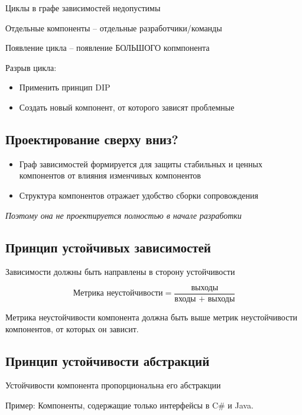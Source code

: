 Циклы в графе зависимостей недопустимы

Отдельные компоненты -- отдельные разработчики/команды

Появление цикла -- появление БОЛЬШОГО копмпонента

Разрыв цикла:

\begin{itemize}
    \item Применить принцип DIP
    \item Создать новый компонент, от которого зависят проблемные
\end{itemize}

\subsection{Проектирование сверху вниз?}

\begin{itemize}
    \item Граф зависимостей формируется для защиты стабильных и ценных
        компонентов от влияния изменчивых компонентов
    \item Структура компонентов отражает удобство сборки сопровождения
\end{itemize}

\textit{Поэтому она не проектируется полностью в начале разработки}

\subsection{Принцип устойчивых зависимостей}

Зависимости должны быть направлены в сторону устойчивости

\begin{equation*}
    \text{Метрика неустойчивости} =
    \frac{\text{выходы}}{\text{входы + выходы}}
\end{equation*}

Метрика неустойчивости компонента должна быть выше метрик неустойчивости
компонентов, от которых он зависит.

\subsection{Принцип устойчивости абстракций}

Устойчивости компонента пропорциональна его абстракции

Пример: Компоненты, содержащие только интерфейсы в C\# и Java.
